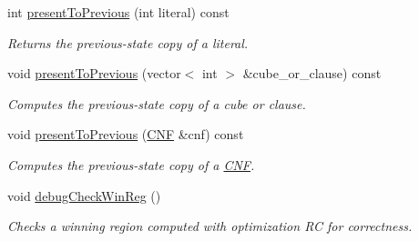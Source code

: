 \begin{DoxyCompactItemize}
int \hyperlink{classLearnSynthSAT_ab7a72deebcdf330a28931720d085547d}{present\-To\-Previous} (int literal) const 
\begin{DoxyCompactList}\small\item\em Returns the previous-\/state copy of a literal. \end{DoxyCompactList}\item 
void \hyperlink{classLearnSynthSAT_a5340af48fec2799116e4271eddff6c92}{present\-To\-Previous} (vector$<$ int $>$ \&cube\-\_\-or\-\_\-clause) const 
\begin{DoxyCompactList}\small\item\em Computes the previous-\/state copy of a cube or clause. \end{DoxyCompactList}\item 
void \hyperlink{classLearnSynthSAT_a1062ed5d0994b4fb1453285811d69f53}{present\-To\-Previous} (\hyperlink{classCNF}{C\-N\-F} \&cnf) const 
\begin{DoxyCompactList}\small\item\em Computes the previous-\/state copy of a \hyperlink{classCNF}{C\-N\-F}. \end{DoxyCompactList}\item 
void \hyperlink{classLearnSynthSAT_a83be7c843ad7ffb8a15a377b2227c891}{debug\-Check\-Win\-Reg} ()
\begin{DoxyCompactList}\small\item\em Checks a winning region computed with optimization R\-C for correctness. \end{DoxyCompactList}\end{DoxyCompactItemize}
